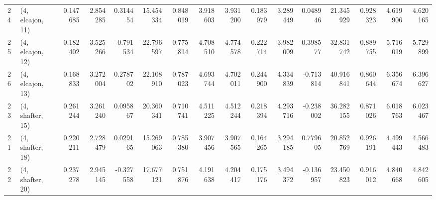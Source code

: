 \begin{tabular}{llrrrrrrrrrrrrrr}
24 &  (4, elcajon, 11) &   0.147685 &  2.854285 &  0.314454 &  15.454334 &  0.848019 &   3.918603 &  3.931200 &  0.183979 &  3.289449 &  0.048946 &   21.345929 &  0.928323 &   4.619906 &   4.620165 \\
25 &  (4, elcajon, 12) &   0.182402 &  3.525266 & -0.791534 &  22.796597 &  0.775814 &   4.708510 &  4.774578 &  0.222714 &  3.982009 &  0.398577 &   32.831742 &  0.889755 &   5.716019 &   5.729899 \\
26 &  (4, elcajon, 13) &   0.168833 &  3.272004 &  0.278702 &  22.108910 &  0.787023 &   4.693744 &  4.702011 &  0.244900 &  4.334839 & -0.713814 &   40.916841 &  0.860644 &   6.356674 &   6.396627 \\
23 &  (4, shafter, 15) &   0.261244 &  3.261240 &  0.095867 &  20.360341 &  0.710741 &   4.511225 &  4.512244 &  0.218394 &  4.293716 & -0.238002 &   36.282155 &  0.871026 &   6.018763 &   6.023467 \\
21 &  (4, shafter, 18) &   0.220211 &  2.728479 &  0.029165 &  15.269063 &  0.785380 &   3.907456 &  3.907565 &  0.164265 &  3.294185 &  0.779605 &   20.852769 &  0.926191 &   4.499443 &   4.566483 \\
22 &  (4, shafter, 20) &   0.237278 &  2.945145 & -0.327558 &  17.677121 &  0.751876 &   4.191638 &  4.204417 &  0.175176 &  3.494372 & -0.136957 &   23.450823 &  0.916012 &   4.840668 &   4.842605 \\
\bottomrule
\end{tabular}

